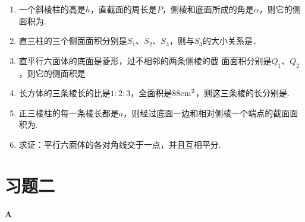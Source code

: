 \begin{enumerate}
\item 一个斜棱柱的高是$h$，直截面的周长是$P$，侧棱和底面所成的角是$\alpha$，则它的侧面积为\blank\blank.
\item 直三柱的三个侧面面积分别是$S_1$、$S_2$、$S_3$，则与$S_3$的大小关系是\blank\blank．
\item 直平行六面体的底面是菱形，过不相邻的两条侧棱的截
面面积分别是$Q_1$、$Q_2$，则它的侧面积是\blank\blank
\item 长方体的三条棱长的比是$1:2:3$，全面积是88${\rm cm^2}$，则这三条棱的长分别是\blank\blank.
\item 正三棱柱的每一条棱长都是$a$，则经过底面一边和相对侧棱一个端点的截面面积为\blank\blank.
\item 求证：平行六面体的各对角线交于一点，并且互相平分.
\end{enumerate}

\section*{习题二}
\begin{center}
    \bfseries A
\end{center}

